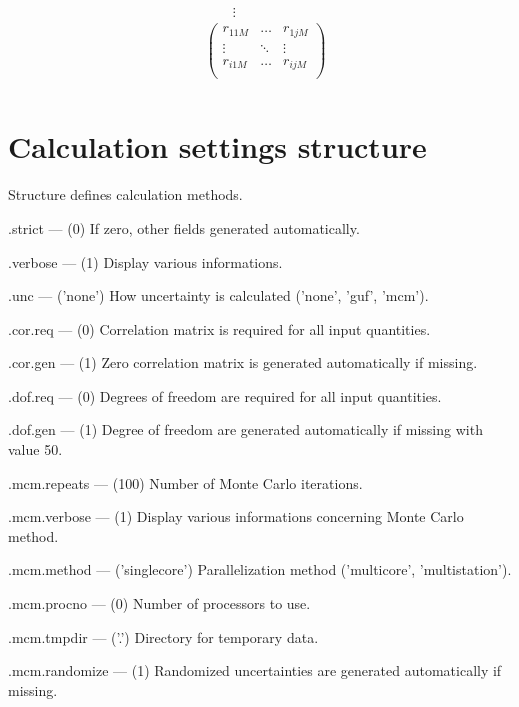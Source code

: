 \documentclass[12pt,a4paper,oneside]{report} %
\begin{document}
\begin{eqnarray*}
                            & \qquad\vdots                        \\
                            & \left(    \begin{array}{ccc}
                                                r_{11M}  & \hdots & r_{1jM} \\
                                                \vdots  & \ddots & \vdots \\
                                                r_{i1M}  & \hdots & r_{ijM} \\
                                        \end{array}\right) \\
\end{eqnarray*}

\section{Calculation settings structure} %
\label{structcalcset}
Structure defines calculation methods.
\begin{tightdesc}
        \item [\textsf{.strict}] ---  (0) If zero, other fields generated automatically.
        \item [\textsf{.verbose}] ---  (1) Display various informations.
        \item [\textsf{.unc}] ---  ('none') How uncertainty is calculated ('none', 'guf', 'mcm').
        \item [\textsf{.cor.req}] ---  (0) Correlation matrix is required for all input quantities.
        \item [\textsf{.cor.gen}] ---  (1) Zero correlation matrix is generated automatically if missing.
        \item [\textsf{.dof.req}] ---  (0) Degrees of freedom are required for all input quantities.
        \item [\textsf{.dof.gen}] ---  (1) Degree of freedom are generated automatically if missing with value 50.
        \item [\textsf{.mcm.repeats}] ---  (100) Number of Monte Carlo iterations.
        \item [\textsf{.mcm.verbose}] ---  (1) Display various informations concerning Monte Carlo method.
        \item [\textsf{.mcm.method}] ---  ('singlecore') Parallelization method ('multicore', 'multistation').
        \item [\textsf{.mcm.procno}] ---  (0) Number of processors to use.
        \item [\textsf{.mcm.tmpdir}] ---  ('.') Directory for temporary data.
        \item [\textsf{.mcm.randomize}] ---  (1) Randomized uncertainties are generated automatically if missing.
\end{tightdesc}
\end{document}
